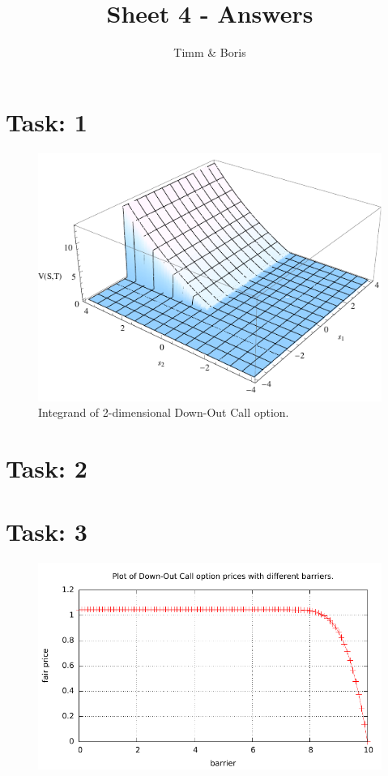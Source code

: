 \documentclass{article}
\title{Sheet 4 - Answers}
\author{Timm \& Boris}
\begin{document}
\maketitle

\section*{Task: 1}

\begin{figure}[htbp]
  \centering
     \includegraphics[width=1.0\textwidth]{../Task01/task01_plot.pdf}
  \caption*{Integrand of 2-dimensional Down-Out Call option.}
\end{figure}

\section*{Task: 2}

\section*{Task: 3}

\begin{figure}[htbp]
  \centering
     \includegraphics[width=1.0\textwidth]{../Task03/sh4_task3_price_plot.pdf}
\end{figure}
\end{document}
